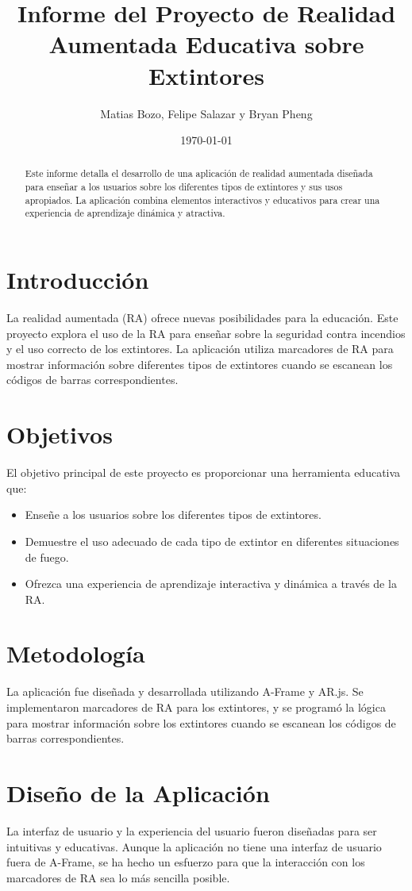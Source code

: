 \documentclass{article}
\title{Informe del Proyecto de Realidad Aumentada Educativa sobre Extintores}
\author{Matias Bozo, Felipe Salazar y Bryan Pheng}
\date{\today}
\begin{document}
\maketitle

\begin{abstract}
Este informe detalla el desarrollo de una aplicación de realidad aumentada diseñada para enseñar a los usuarios sobre los diferentes tipos de extintores y sus usos apropiados. La aplicación combina elementos interactivos y educativos para crear una experiencia de aprendizaje dinámica y atractiva.
\end{abstract}

\section{Introducción}
La realidad aumentada (RA) ofrece nuevas posibilidades para la educación. Este proyecto explora el uso de la RA para enseñar sobre la seguridad contra incendios y el uso correcto de los extintores. La aplicación utiliza marcadores de RA para mostrar información sobre diferentes tipos de extintores cuando se escanean los códigos de barras correspondientes.

\section{Objetivos}
El objetivo principal de este proyecto es proporcionar una herramienta educativa que:
\begin{itemize}
  \item Enseñe a los usuarios sobre los diferentes tipos de extintores.
  \item Demuestre el uso adecuado de cada tipo de extintor en diferentes situaciones de fuego.
  \item Ofrezca una experiencia de aprendizaje interactiva y dinámica a través de la RA.
\end{itemize}

\section{Metodología}
La aplicación fue diseñada y desarrollada utilizando A-Frame y AR.js. Se implementaron marcadores de RA para los extintores, y se programó la lógica para mostrar información sobre los extintores cuando se escanean los códigos de barras correspondientes.

\section{Diseño de la Aplicación}
La interfaz de usuario y la experiencia del usuario fueron diseñadas para ser intuitivas y educativas. Aunque la aplicación no tiene una interfaz de usuario fuera de A-Frame, se ha hecho un esfuerzo para que la interacción con los marcadores de RA sea lo más sencilla posible.
\end{document}
